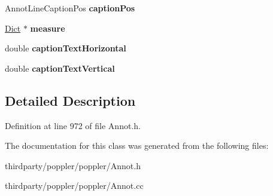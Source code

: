 \begin{DoxyCompactItemize}
Annot\+Line\+Caption\+Pos {\bfseries caption\+Pos}
\item 
\mbox{\label{class_annot_line_a73974575bfceb0ba8db94cb9154757ae}} 
\hyperlink{class_dict}{Dict} $\ast$ {\bfseries measure}
\item 
\mbox{\label{class_annot_line_abac7a327212f8f40ff818d2b574b8083}} 
double {\bfseries caption\+Text\+Horizontal}
\item 
\mbox{\label{class_annot_line_aadd7a679f70b84a94fded782dec62118}} 
double {\bfseries caption\+Text\+Vertical}
\end{DoxyCompactItemize}


\subsection{Detailed Description}


Definition at line 972 of file Annot.\+h.



The documentation for this class was generated from the following files\+:\begin{DoxyCompactItemize}
\item 
thirdparty/poppler/poppler/Annot.\+h\item 
thirdparty/poppler/poppler/Annot.\+cc\end{DoxyCompactItemize}
